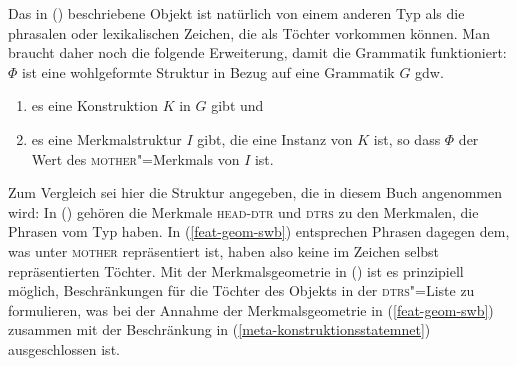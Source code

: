 \z
Das in () beschriebene Objekt ist natürlich von einem anderen Typ
als die phrasalen oder lexikalischen Zeichen, die als Töchter vorkommen können. Man braucht daher
noch die folgende Erweiterung, damit die Grammatik funktioniert:
\newpage
\ea
\label{meta-konstruktionsstatemnet}
$\Phi$ ist eine wohlgeformte Struktur in Bezug auf eine Grammatik $G$ gdw.\
\begin{enumerate}
\item es eine Konstruktion $K$ in $G$ gibt und
\item es eine Merkmalstruktur $I$ gibt, die eine Instanz von $K$ ist, so dass
      $\Phi$ der Wert des \textsc{mother}"=Merkmals von $I$ ist.
\end{enumerate}
\z
Zum Vergleich sei hier die Struktur angegeben, die in diesem Buch angenommen wird:
\ea
\label{feat-geom-Müller}
\z
In () gehören die Merkmale \textsc{head-dtr} und \textsc{dtrs} zu den Merkmalen, die
\zb Phrasen vom Typ \type{head"=complement"=phrase} haben. In (\ref{feat-geom-swb}) entsprechen
Phrasen dagegen dem, was unter \textsc{mother} repräsentiert ist, haben also keine im Zeichen selbst
repräsentierten Töchter. Mit der Merkmalsgeometrie in (\mex{0}) ist es prinzipiell möglich,
Beschränkungen für die Töchter des Objekts in der \textsc{dtrs}"=Liste zu formulieren, was bei
der Annahme der Merkmalsgeometrie in (\ref{feat-geom-swb}) zusammen mit der Beschränkung in
(\ref{meta-konstruktionsstatemnet}) ausgeschlossen ist. 


